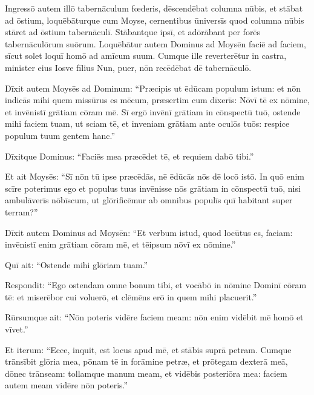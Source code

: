 Ingressō autem illō
tabernāculum fœderis, dēscendēbat columna nūbis, et stābat ad ōstium,
loquēbāturque cum Moyse, 
cernentibus ūniversīs quod
columna nūbis stāret ad ōstium tabernāculī. Stābantque
ipsī, et adōrābant per forēs tabernāculōrum suōrum. 
Loquēbātur autem Dominus ad Moysēn faciē ad faciem, sīcut solet loquī homō
ad amīcum suum. Cumque ille reverterētur in castra, minister eius Iosve
fīlius Nun, puer, nōn recēdēbat dē
tabernāculō. 

Dīxit autem Moysēs ad Dominum:
``Præcipis ut ēdūcam populum istum: et nōn
indicās mihi quem missūrus es mēcum,
præsertim cum dīxerīs: Nōvī tē ex nōmine, et
invēnistī grātiam cōram mē. 
Sī ergō invēnī grātiam in cōnspectū tuō,
ostende mihi faciem tuam, ut sciam tē, et inveniam grātiam ante oculōs tuōs:
respice populum tuum gentem hanc.''

Dīxitque Dominus: ``Faciēs mea præcēdet tē, et
requiem dabō tibi.''

Et ait
Moysēs: ``Sī nōn tū ipse præcēdās, nē ēdūcās nōs dē locō istō. 
In quō
enim scīre poterimus ego et populus tuus invēnisse nōs grātiam in cōnspectū
tuō, nisi ambulāverīs nōbīscum, ut glōrificēmur ab omnibus populīs quī habitant super terram?''

Dīxit
autem Dominus ad Moysēn: ``Et verbum istud, quod locūtus es, faciam:
invēnistī enim grātiam cōram mē, et tēipsum nōvī ex nōmine.''

Quī ait: ``Ostende mihi glōriam tuam.''

Respondit: ``Ego ostendam omne bonum tibi, et
vocābō in nōmine Dominī cōram tē: et miserēbor cui
voluerō, et clēmēns erō in quem mihi placuerit.''

Rūrsumque ait: ``Nōn poteris vidēre faciem meam: nōn enim
vidēbit mē homō et vīvet.'' 

Et iterum: ``Ecce, inquit, est locus apud mē,
et stābis suprā petram.
Cumque trānsībit
glōria mea, pōnam tē in forāmine petræ, et
prōtegam dexterā meā, dōnec trānseam: 
tollamque manum
meam, et vidēbis posteriōra mea: faciem autem meam vidēre nōn poteris.''
